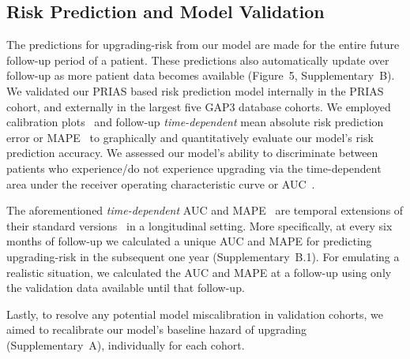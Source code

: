 \subsection{Risk Prediction and Model Validation}
The predictions for upgrading-risk from our model are made for the entire future follow-up period of a patient. These predictions also automatically update over follow-up as more patient data becomes available (Figure~5, Supplementary~B). We validated our PRIAS based risk prediction model internally in the PRIAS cohort, and externally in the largest five GAP3 database cohorts. We employed calibration plots~\citep{royston2013external,steyerberg2010assessing} and follow-up \textit{time-dependent} mean absolute risk prediction error or MAPE~\citep{rizopoulos2017dynamic} to graphically and quantitatively evaluate our model's risk prediction accuracy. We assessed our model's ability to discriminate between patients who experience/do not experience upgrading via the time-dependent area under the receiver operating characteristic curve or AUC~\citep{rizopoulos2017dynamic}. 

The aforementioned \textit{time-dependent} AUC and MAPE~\citep{rizopoulos2017dynamic} are temporal extensions of their standard versions~\citep{steyerberg2010assessing} in a longitudinal setting. More specifically, at every six months of follow-up we calculated a unique AUC and MAPE for predicting upgrading-risk in the subsequent one year (Supplementary~B.1). For emulating a realistic situation, we calculated the AUC and MAPE at a follow-up using only the validation data available until that follow-up. 

Lastly, to resolve any potential model miscalibration in validation cohorts, we aimed to recalibrate our model's baseline hazard of upgrading (Supplementary~A), individually for each cohort.
